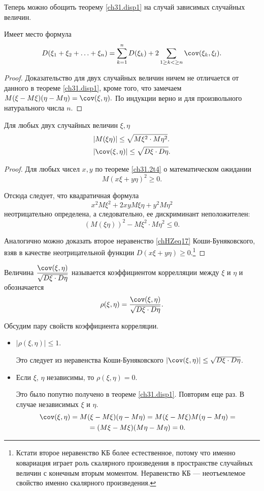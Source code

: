 Теперь можно обощить теорему \ref{ch31.disp1} на случай зависимых случайных величин.
\begin{thm}
Имеет место формула
$$
D(\xi_1 + \xi_2 + \ldots + \xi_n) = \sum\limits_{k=1}^{n} D(\xi_k) + 2 \sum\limits_{1\ge k < \ge n} \cov (\xi_k,\xi_l).
$$
\end{thm}
\begin{proof}
Доказательство для двух случайных величин ничем не отличается от данного в теореме \ref{ch31.disp1}, кроме того, что замечаем  $M(\xi - M\xi)(\eta - M\eta)=\cov (\xi,\eta).$ По индукции верно и для произвольного натурального числа $n$.
\end{proof}
\begin{thm}
Для любых двух случайных величин $\xi, \eta$
\begin{align}
&|M(\xi\eta)| \le \sqrt{M\xi^2 \cdot M\eta^2}.\\
&|\cov(\xi,\eta)| \le \sqrt{D\xi\cdot D\eta}.\label{chHZeq17}
\end{align}
\end{thm}
\begin{proof}
Для любых чисел $x, y$ по теореме \ref{ch31.2t4} о математическом ожидании 
$$
M(x\xi + y\eta)^2 \ge 0.
$$

Отсюда следует, что квадратичная формула
$$
x^2M\xi^2 + 2xyM\xi\eta + y^2M\eta^2
$$
неотрицательно определена, а следовательно, ее дискриминант неположителен:
$$
(M(\xi\eta))^2 - M\xi^2 \cdot M\eta^2 \le 0.
$$

Аналогично можно доказать второе неравенство \eqref{chHZeq17} Коши-Буняковского, взяв в качестве неотрицательной функции $D(x\xi + y\eta)\ge 0$.\footnote{Кстати второе неравенство КБ более естественное, потому что именно ковариация играет роль скалярного произведения в пространстве случайных величин с конечным вторым моментом. Неравенство КБ --- неотъемлемое свойство именно скалярного произведения.}
\end{proof}

\begin{defn}
Величина $\displaystyle\frac{\cov(\xi,\eta)}{\sqrt{D\xi\cdot D\eta}}$ называется коэффициентом коррелляции между $\xi$ и $\eta$  и обозначается $$\rho (\xi,\eta) = \frac{\cov(\xi,\eta)}{\sqrt{D\xi\cdot D\eta}}.$$
\end{defn}

Обсудим пару свойств коэффициента корреляции.
\begin{itemize}
\item 
$|\rho(\xi,\eta)|\le1$.

Это следует из неравенства Коши-Буняковского $|\cov(\xi,\eta)| \le \sqrt{D\xi\cdot D\eta}$.
\item
Если $\xi$, $\eta$ независимы, то $\rho(\xi,\eta)=0$.

Это было попутно получено в теореме \ref{ch31.disp1}. Повторим еще раз. В случае независимых $\xi$ и $\eta$.
\begin{multline*}
\cov(\xi,\eta)=M(\xi - M\xi)(\eta - M\eta) = M(\xi - M\xi)M(\eta - M\eta)=\\ = (M\xi - M\xi)(M\eta - M\eta) = 0.
\end{multline*}
\end{itemize}